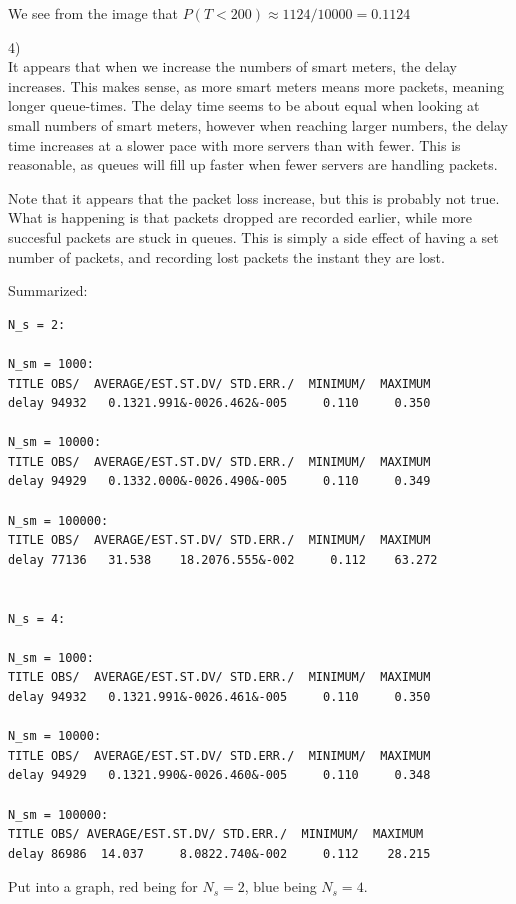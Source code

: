 \documentclass[11pt]{article}
\begin{document}
We see from the image that $P(T < 200) \approx 1124 / 10000 = 0.1124$


4)\\ It appears that when we increase the numbers of smart meters, the delay increases. This makes sense, as more smart meters means more packets, meaning longer queue-times. The delay time seems to be about equal when looking at small numbers of smart meters, however when reaching larger numbers, the delay time increases at a slower pace with more servers than with fewer. This is reasonable, as queues will fill up faster when fewer servers are handling packets.

Note that it appears that the packet loss increase, but this is probably not true. What is happening is that packets dropped are recorded earlier, while more succesful packets are stuck in queues. This is simply a side effect of having a set number of packets, and recording lost packets the instant they are lost.

Summarized:

\begin{lstlisting}
N_s = 2:

N_sm = 1000:
TITLE OBS/  AVERAGE/EST.ST.DV/ STD.ERR./  MINIMUM/  MAXIMUM
delay 94932   0.1321.991&-0026.462&-005     0.110     0.350

N_sm = 10000:
TITLE OBS/  AVERAGE/EST.ST.DV/ STD.ERR./  MINIMUM/  MAXIMUM
delay 94929   0.1332.000&-0026.490&-005     0.110     0.349

N_sm = 100000:
TITLE OBS/  AVERAGE/EST.ST.DV/ STD.ERR./  MINIMUM/  MAXIMUM
delay 77136   31.538    18.2076.555&-002     0.112    63.272


N_s = 4:

N_sm = 1000:
TITLE OBS/  AVERAGE/EST.ST.DV/ STD.ERR./  MINIMUM/  MAXIMUM
delay 94932   0.1321.991&-0026.461&-005     0.110     0.350

N_sm = 10000:
TITLE OBS/  AVERAGE/EST.ST.DV/ STD.ERR./  MINIMUM/  MAXIMUM
delay 94929   0.1321.990&-0026.460&-005     0.110     0.348

N_sm = 100000:
TITLE OBS/ AVERAGE/EST.ST.DV/ STD.ERR./  MINIMUM/  MAXIMUM
delay 86986  14.037     8.0822.740&-002     0.112    28.215

\end{lstlisting}

Put into a graph, red being for $N_s = 2$, blue being $N_s = 4$.
\end{document}
